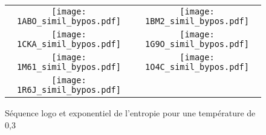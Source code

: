    \begin{figure}[t]
     \centering
     \begin{tabular}{cc}
       \texttt{[image: 1ABO\_simil\_bypos.pdf]} &
       \texttt{[image: 1BM2\_simil\_bypos.pdf]} \\
       \texttt{[image: 1CKA\_simil\_bypos.pdf]} &
       \texttt{[image: 1G9O\_simil\_bypos.pdf]} \\
       \texttt{[image: 1M61\_simil\_bypos.pdf]} &
       \texttt{[image: 1O4C\_simil\_bypos.pdf]} \\
       \texttt{[image: 1R6J\_simil\_bypos.pdf]} \\
     \end{tabular}
     
     \caption{Séquence logo et exponentiel de l'entropie pour une température de 0,3}
     \label{fig-seqlogo-T=03}
   \end{figure}

